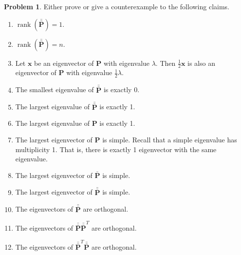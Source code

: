 \documentclass[10pt]{article}
\theoremstyle{definition}
\newtheorem{problem}{Problem}
\DeclareMathOperator{\rank}{rank}
\newcommand{\p}{\mathbf P}
\newcommand{\pb}{\bar {\p}}
\newcommand{\pbb}{\bar {\pb}}
\newcommand{\trans}[1]{{#1}^{T}}
\newcommand{\x}{\mathbf x}
\begin{document}
\newpage
\begin{problem}
    Either prove or give a counterexample to the following claims.
    \begin{enumerate}
        \item
            $\rank(\pbb) = 1$.
            \vspace{4.5in}
        \item
            $\rank(\pbb) = n$.
            \vspace{4.5in}

        \item
            Let $\x$ be an eigenvector of $\p$ with eigenvalue $\lambda$.
            Then $\frac 1 2 \x$ is also an eigenvector of $\p$ with eigenvalue $\frac 1 2 \lambda$.
            \vspace{4.5in}

        \item
            The smallest eigenvalue of $\pbb$ is exactly 0.
            \vspace{4.5in}
        \item
            The largest eigenvalue of $\pbb$ is exactly 1.
            \vspace{4.5in}
        \item
            The largest eigenvalue of $\p$ is exactly 1.
            \vspace{4.5in}

        \item
            The largest eigenvector of $\p$ is simple.
            Recall that a simple eigenvalue has multiplicity 1.
            That is, there is exactly 1 eigenvector with the same eigenvalue.
            \vspace{4.5in}

        \item
            The largest eigenvector of $\pb$ is simple.
            \vspace{4.5in}

        \item
            The largest eigenvector of $\pbb$ is simple.
            \vspace{4.5in}

        \item
            The eigenvectors of $\pbb$ are orthogonal.
            \vspace{4.5in}

        \item
            The eigenvectors of $\pbb\trans\pbb$ are orthogonal.
            \vspace{4.5in}

        \item
            The eigenvectors of $\trans\pbb\pbb$ are orthogonal.
            \vspace{4.5in}
    \end{enumerate}
\end{problem}
\end{document}
